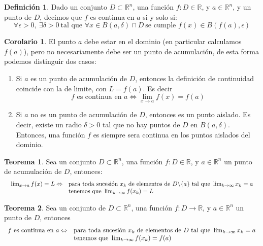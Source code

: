 \documentclass[10pt]{article}
\theoremstyle{definition}
\newtheorem{definition}{Definición}[section]
\newtheorem{theorem}{Teorema}[section]
\newtheorem{corollary}{Corolario}[theorem]
\begin{document}
\begin{definition}
    Dado un conjunto $D\subset\mathbb{R}^n$, una función $f:D\in\mathbb{R}$, y $a\in\mathbb{R}^n$, y un punto de $D$, decimos que $f$ es continua en $a$ si y solo si: $$\forall\epsilon>0,\ \exists\delta>0\ \text{tal que }\forall x\in B(a,\delta)\cap D\ \text{se cumple }f(x)\in B(f(a),\epsilon)$$
\end{definition}
\begin{corollary}
    El punto $a$ debe estar en el dominio (en particular calculamos $f(a)$), pero no necesariamente debe ser un punto de acumulación, de esta forma podemos distinguir dos casos:
    \begin{enumerate}
        \item Si $a$ es un punto de acumulación de $D$, entonces la definición de continuidad coincide con la de limite, con $L=f(a)$. Es decir $$f\text{ es continua en }a\Leftrightarrow \lim_{x \to a}f(x)=f(a)$$
        \item Si $a$ no es un punto de acumulación de $D$, entonces es un punto aislado. Es decir, existe un radio $\delta>0$ tal que no hay puntos de $D$ en $B(a,\delta)$. Entonces, una función $f$ es siempre sera continua en los puntos aislados del dominio.
    \end{enumerate}
\end{corollary}
\begin{theorem}
    Sea un conjunto $D\subset\mathbb{R}^n$, una función $f:D\in\mathbb{R}$, y $a\in\mathbb{R}^n$ un punto de acumulación de $D$, entonces: $$ \begin{array}{l}
\begin{array}{ c l }
\lim _{x\rightarrow a} f( x) =L\Leftrightarrow  & \text{para toda sucesión } x_{k} \ \text{de elementos de } D\backslash \{a\} \ \text{tal que }\lim _{k\rightarrow \infty } x_{k} =a\\
 & \text{tenemos que }\lim _{k\rightarrow \infty } f( x_{k}) =L
\end{array}\\
\end{array}$$
\end{theorem}
\begin{theorem}
    Sea un conjunto de $D\subset\mathbb{R}^n$, una función $f:D\to\mathbb{R}$, y $a\in\mathbb{R}^n$ un punto de $D$, entonces $$\begin{array}{ c l }
f\ \text{es continua en } a\Leftrightarrow  & \text{para toda sucesión } x_{k} \ \text{de elementos de } D\ \text{tal que }\lim _{k\rightarrow \infty } x_{k} =a\\
 & \text{tenemos que }\lim _{k\rightarrow \infty } f( x_{k}) =f( a)
\end{array}$$
\end{theorem}
\end{document}
